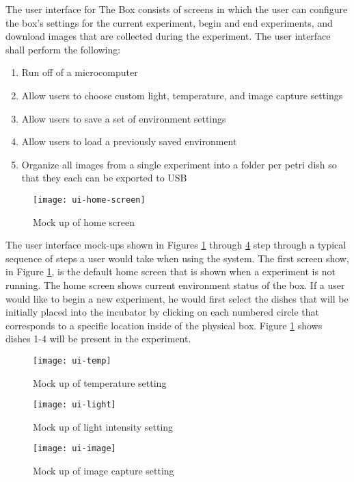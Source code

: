 The user interface for The Box consists of screens in which the user can configure the box’s settings for the current experiment, begin and end experiments, and download images that are collected during the experiment. The user interface shall perform the following: 

\begin{enumerate}
	\item	Run off of a microcomputer
	\item	Allow users to choose custom light, temperature, and image capture settings
	\item   Allow users to save a set of environment settings
	\item	Allow users to load a previously saved environment 
	\item	Organize all images from a single experiment into a folder per petri dish so that they each can be exported to USB 

\end{enumerate}

\begin{figure}[H]
\texttt{[image: ui-home-screen]}
\caption{\label{figure:ui-home} Mock up of home screen}
\end{figure}

The user interface mock-ups shown in Figures \ref{figure:ui-home} through \ref{figure:ui-image} step through a typical sequence of steps a user would take when using the system. The first screen show, in Figure \ref{figure:ui-home}, is the default home screen that is shown when a experiment is not running. The home screen shows current environment status of the box. If a user would like to begin a new experiment, he would first select the dishes that will be initially placed into the incubator by clicking on each numbered circle that corresponds to a specific location inside of the physical box. Figure \ref{figure:ui-home} shows dishes 1-4 will be present in the experiment. 

\begin{figure}[H]
\texttt{[image: ui-temp]}
\caption{\label{figure:ui-temp} Mock up of temperature setting}

\end{figure}

\begin{figure}[H]
\texttt{[image: ui-light]}
\caption{\label{figure:ui-light} Mock up of light intensity setting}
\end{figure}

\begin{figure}[H]
\texttt{[image: ui-image]}
\caption{\label{figure:ui-image} Mock up of image capture setting}
\end{figure}


